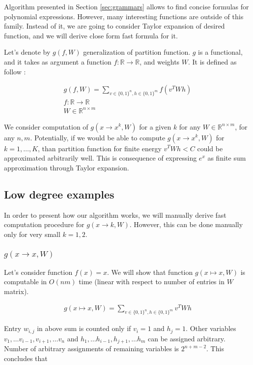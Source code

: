 Algorithm presented in Section
\ref{sec:grammars} allows to find concise formulas for polynomial expressions.
However, many interesting functions are outside of this family.  Instead of it,
we are going to consider Taylor expansion of desired function, and we will
derive close form fast formula for it.

Let's denote by $g(f, W)$ generalization of partition function. 
$g$ is a functional, and it takes as argument a function $f : \mathbb{R} \rightarrow \mathbb{R}$,
and weights $W$. It is defined as follow : 

\begin{gather*}
g(f, W) = \sum_{v \in \{0, 1\}^n, h \in \{0, 1\}^m} f(v^TWh) \\
f : \mathbb{R} \rightarrow \mathbb{R}\\
W \in \mathbb{R}^{n \times m}
\end{gather*}

We consider computation of $g(x \rightarrow x^k, W)$ for a given $k$ for any $W
\in \mathbb{R}^{n \times m}$, for any $n, m$. Potentially, if we would be able
to compute $g(x \rightarrow x^k, W)$ for $k = 1, \dots, K$, than partition
function for finite energy $v^TWh < C$ could be approximated arbitrarily well.
This is consequence of expressing $e^{x}$ as finite sum approximation through
Taylor expansion.

\subsection{Low degree examples} In order to present how our algorithm works,
we will manually derive fast computation procedure for $g(x \rightarrow k, W)$.
However, this can be done manually only for very small $k = 1, 2$. 


\subsubsection{$g(x \rightarrow x, W)$} Let's consider function $f(x) = x$. We
will show that function $g(x \mapsto x, W)$ is computable in $O(nm)$ time
(linear with respect to number of entries in $W$ matrix).
 
\begin{gather*}
	g(x \mapsto x, W) = \sum_{v \in \{0, 1\}^n, h \in \{0, 1\}^m} v^TWh
\end{gather*}

Entry $w_{i,j}$ in above sum is counted only if $v_i = 1$ and $h_j = 1$. Other variables
$v_1, \dots v_{i-1}, v_{i+1}, \dots v_n$ and $h_1, \dots h_{i-1}, h_{j+1}, \dots h_m$ can be 
assigned arbitrary. Number of arbitrary assignments of remaining variables is $2^{n + m - 2}$. 
This concludes that 

